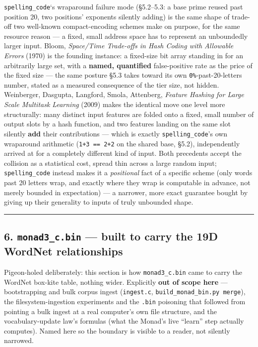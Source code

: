 \documentclass[
  10pt,
]{article}
\begin{document}
\texttt{spelling\_code}`s wraparound failure mode (§5.2--5.3: a base
prime reused past position 20, two positions' exponents silently adding)
is the same shape of trade-off two well-known compact-encoding schemes
make on purpose, for the same resource reason --- a fixed, small address
space has to represent an unboundedly larger input. Bloom,
\emph{Space/Time Trade-offs in Hash Coding with Allowable Errors} (1970)
is the founding instance: a fixed-size bit array standing in for an
arbitrarily large set, with a \textbf{named, quantified} false-positive
rate as the price of the fixed size --- the same posture §5.3 takes
toward its own \texttt{0\%}-past-20-letters number, stated as a measured
consequence of the tier size, not hidden. Weinberger, Dasgupta,
Langford, Smola, Attenberg, \emph{Feature Hashing for Large Scale
Multitask Learning} (2009) makes the identical move one level more
structurally: many distinct input features are folded onto a fixed,
small number of output slots by a hash function, and two features
landing on the same slot silently \textbf{add} their contributions ---
which is exactly \texttt{spelling\_code}'s own wraparound arithmetic
(\texttt{1+3\ ==\ 2+2} on the shared base, §5.2), independently arrived
at for a completely different kind of input. Both precedents accept the
collision as a statistical cost, spread thin across a large random
input; \texttt{spelling\_code} instead makes it a \emph{positional} fact
of a specific scheme (only words past 20 letters wrap, and exactly where
they wrap is computable in advance, not merely bounded in expectation)
--- a narrower, more exact guarantee bought by giving up their
generality to inputs of truly unbounded shape.

\begin{center}\rule{0.5\linewidth}{0.5pt}\end{center}

\hypertarget{monad3_c.bin-built-to-carry-the-19d-wordnet-relationships}{%
\subsection{\texorpdfstring{6. \texttt{monad3\_c.bin} --- built to carry
the 19D WordNet
relationships}{6. monad3\_c.bin --- built to carry the 19D WordNet relationships}}\label{monad3_c.bin-built-to-carry-the-19d-wordnet-relationships}}

Pigeon-holed deliberately: this section is how \texttt{monad3\_c.bin}
came to carry the WordNet box-kite table, nothing wider. Explicitly
\textbf{out of scope here} --- bootstrapping and bulk corpus ingest
(\texttt{ingest.c}, \texttt{build\_monad\_bin.py\ merge}), the
filesystem-ingestion experiments and the \texttt{.bin} poisoning that
followed from pointing a bulk ingest at a real computer's own file
structure, and the vocabulary-update law's formulas (what the Monad's
live ``learn'' step actually computes). Named here so the boundary is
visible to a reader, not silently narrowed.
\end{document}
